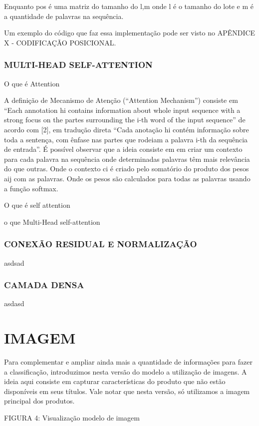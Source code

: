 Enquanto pos é uma matriz do tamanho do l,m onde l é o tamanho do lote e m é a quantidade de palavras na sequência.

Um exemplo do código que faz essa implementação pode ser visto no APÊNDICE X - CODIFICAÇÃO POSICIONAL.

\subsubsection{MULTI-HEAD SELF-ATTENTION}
O que é Attention

A definição de Mecanismo de Atenção (“Attention Mechanism”) consiste em “Each annotation hi contains information about whole input sequence with a strong focus on the partes surrounding the i-th word of the input sequence” de acordo com [2], em tradução direta “Cada anotação hi contém informação sobre toda a sentença, com ênfase nas partes que rodeiam a palavra i-th da sequência de entrada”.
É possível observar que a ideia consiste em em criar um contexto para cada palavra na sequência onde determinadas palavras têm mais relevância do que outras.
Onde o contexto ci é criado pelo somatório do produto dos pesos aij com as palavras. Onde os pesos são calculados para todas as palavras usando a função softmax.

O que é self attention

o que Multi-Head self-attention


\subsubsection{CONEXÃO RESIDUAL E NORMALIZAÇÃO}
asdsad

\subsubsection{CAMADA DENSA}
asdasd


\section{IMAGEM}

Para complementar e ampliar ainda mais a quantidade de informações para fazer a classificação, introduzimos nesta versão do modelo a utilização de imagens. A ideia aqui consiste em capturar características do produto que não estão disponíveis em seus títulos.
Vale notar que nesta versão, só utilizamos a imagem principal dos produtos.

FIGURA 4: Visualização modelo de imagem

